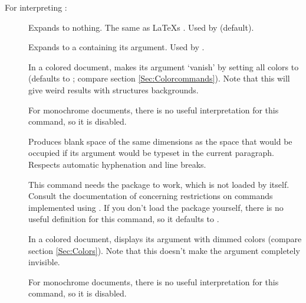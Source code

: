 \documentclass[12pt]{scrartcl}
\let\newslide=\relax
\begin{document}
  For interpreting :
  \begin{description}
  \item[]
    Expands to nothing. The same as \LaTeX s . Used by
     (default).

  \item[]
    Expands to a  containing its argument. Used by
    .

  \item[]
    In a colored document, makes its argument `vanish' by setting all colors to
     (defaults to ; compare section
    \ref{Sec:Colorcommands}). Note that this will give weird results with
    structures backgrounds.

    For monochrome documents, there is no useful interpretation for this command, so it is disabled.

    \newslide

  \item[{}]
    Produces blank space of the same dimensions as the space that would be
    occupied if its argument would be typeset in the current paragraph. Respects automatic hyphenation and line breaks.

    This command needs the \href{ftp://ftp.dante.de/tex-archive/help/Catalogue/entries/soul.html}{} package
    to work, which is not loaded by  itself. Consult the documentation of
    \href{ftp://ftp.dante.de/tex-archive/help/Catalogue/entries/soul.html}{} concerning restrictions on
    commands implemented using . If you don't load the  package yourself, there is no useful
    definition for this command, so it defaults to .

    \newslide

  \item[]
    In a colored document, displays its argument with dimmed colors (compare
    section \ref{Sec:Colors}). Note that this doesn't make the argument completely invisible.

    For monochrome documents, there is no useful interpretation for this command, so it is disabled.
  \end{description}
\end{document}
